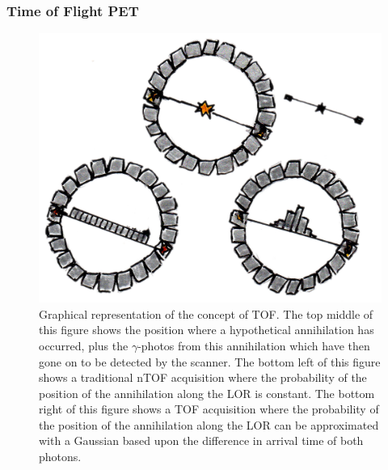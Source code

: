             \subsubsection{Time of Flight PET} \label{sec:time_of_flight_pet}
                \begin{figure}
                    \centering
                    
                    \includegraphics[width=1.0\linewidth]{figures/background_tof.png}
                    
                    \captionsetup{singlelinecheck=false, justification=raggedright}
                    \caption{Graphical representation of the concept of \gls{TOF}. The top middle of this figure shows the position where a hypothetical annihilation has occurred, plus the $\gamma$-photos from this annihilation which have then gone on to be detected by the scanner. The bottom left of this figure shows a traditional \gls{nTOF} acquisition where the probability of the position of the annihilation along the \gls{LOR} is constant. The bottom right of this figure shows a \gls{TOF} acquisition where the probability of the position of the annihilation along the \gls{LOR} can be approximated with a Gaussian based upon the difference in arrival time of both photons.} \label{fig:time_of_flight_pet_tof}
                \end{figure}
                
